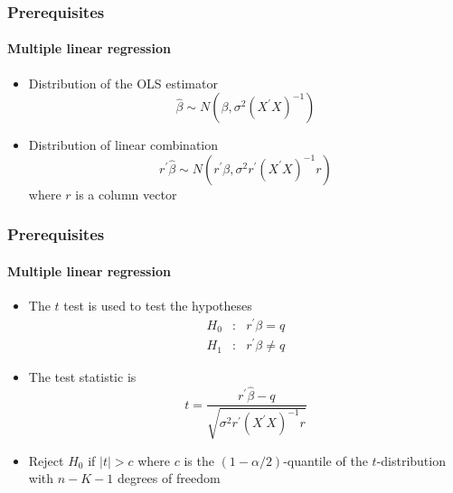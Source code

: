\documentclass[notes=show]{beamer}
\begin{document}
\begin{frame}\frametitle{Prerequisites}\framesubtitle{Multiple linear regression}
\begin{itemize}
    \item Distribution of the OLS estimator
    \begin{equation*}
        \hat{\beta}\sim N\left( \beta ,\sigma ^{2}\left( X^{\prime }X\right)^{-1}\right)
    \end{equation*}
    \item Distribution of linear combination
    \begin{equation*}
    r^{\prime }\hat{\beta}\sim N\left( r^{\prime }\beta ,\sigma ^{2}r^{\prime}\left( X^{\prime }X\right) ^{-1}r\right)
    \end{equation*}
    where $r$ is a column vector
\end{itemize}
\end{frame}



\begin{frame}\frametitle{Prerequisites}\framesubtitle{Multiple linear regression}
\begin{itemize}
    \item The $t$ test is used to test the hypotheses%
        \begin{eqnarray*}
            H_{0} &:&r^{\prime }\beta =q \\
            H_{1} &:&r^{\prime }\beta \neq q
        \end{eqnarray*}
    \item The test statistic is
        \begin{equation*}
            t=\frac{r^{\prime }\hat{\beta}-q}{\sqrt{\sigma ^{2}r^{\prime }\left(X^{\prime }X\right) ^{-1}r}}
        \end{equation*}
    \item Reject $H_{0}$ if $|t|>c$ where $c$ is the $\left( 1-\alpha /2\right) $-quantile of the $t$-distribution with $n-K-1$ degrees of freedom
\end{itemize}
\end{frame}
\end{document}
